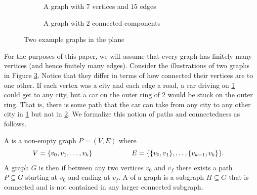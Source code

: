 \documentclass[11pt]{article}
\begin{document}
\begin{figure}
    \centering
    \begin{subfigure}[t]{0.45\textwidth}
        \centering
        \caption{A graph with $7$ vertices and $15$ edges}
        \label{fig:basic_graph}
    \end{subfigure}\hfill
    \begin{subfigure}[t]{0.45\textwidth}
        \centering
        \caption{A graph with $2$ connected components}
        \label{fig:connected_components}
    \end{subfigure}
    \caption{Two example graphs in the plane}
    \label{fig:graph_visual}
\end{figure}

For the purposes of this paper, we will assume that every graph has finitely many vertices (and hence finitely many edges). Consider the illustrations of two graphs in Figure \ref{fig:graph_visual}. Notice that they differ in terms of how connected their vertices are to one other. If each vertex was a city and each edge a road, a car driving on \ref{fig:basic_graph} could get to any city, but a car on the outer ring of \ref{fig:connected_components} would be stuck on the outer ring. That is, there is some path that the car can take from any city to any other city in \ref{fig:basic_graph} but not in \ref{fig:connected_components}. We formalize this notion of paths and connectedness as follows.

\begin{definition}[Connectedness]
    A  is a non-empty graph $P = (V,E)$ where
    \[
        V = \qty{v_0, v_1, \ldots, v_k} \hspace{2cm} E = \qty{\qty{v_0,v_1}, \ldots, \qty{v_{k-1}, v_k}}
    .\]
    A graph $G$ is then  if between any two vertices $v_0$ and $v_f$ there exists a path $P \subseteq G$ starting at $v_0$ and ending at $v_f$. A  of a graph is a subgraph $H \subseteq G$ that is connected and is not contained in any larger connected subgraph.
\end{definition}
\end{document}
